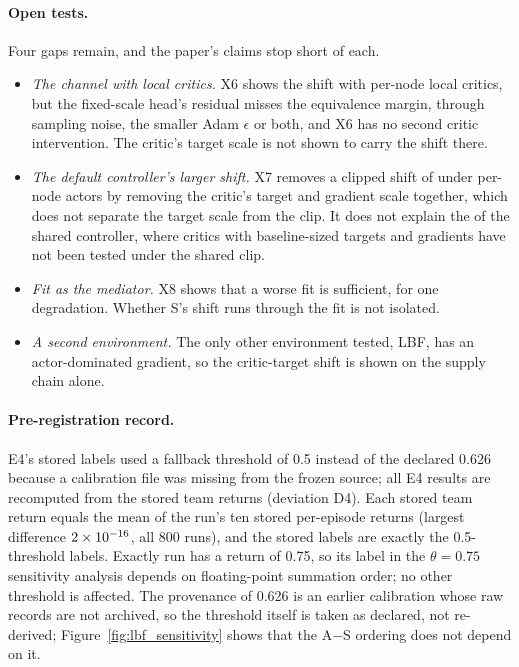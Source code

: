 \paragraph{Open tests.} Four gaps remain, and the paper's claims stop short of each.
\begin{itemize}
\item \emph{The channel with local critics.} X6 shows the shift with per-node local critics, but the fixed-scale head's
residual misses the equivalence margin, through sampling noise, the smaller Adam $\epsilon$ or both, and X6 has no second critic intervention. The critic's target scale is not shown to carry the shift there.
\item \emph{The default controller's larger shift.} X7 removes a clipped shift of \VxsevPlain{} under per-node actors by
removing the critic's target and gradient scale together, which does not separate the target scale from the clip. It does not explain the \VjtPStd{} of the shared controller, where critics with
baseline-sized targets and gradients have not been tested under the shared clip.
\item \emph{Fit as the mediator.} X8 shows that a worse fit is sufficient, for one degradation. Whether S's shift runs
through the fit is not isolated.
\item \emph{A second environment.} The only other environment tested, LBF, has an actor-dominated gradient, so the
critic-target shift is shown on the supply chain alone.
\end{itemize}

\paragraph{Pre-registration record.} E4's stored labels used a fallback threshold of 0.5 instead of the
declared 0.626 because a calibration file was missing from the frozen source; all E4 results are recomputed
from the stored team returns (deviation D4). Each stored team return equals the mean of the run's ten stored
per-episode returns (largest difference $2\times10^{-16}{}$, all 800 runs), and the stored labels are exactly the
0.5-threshold labels. Exactly \VdaETies{} run has a return of 0.75, so its label in the $\theta=0.75$ sensitivity
analysis depends on floating-point summation order; no other threshold is affected. The provenance of 0.626 is an earlier calibration whose raw
records are not archived, so the threshold itself is taken as declared, not re-derived; Figure~\ref{fig:lbf_sensitivity}
shows that the A$-$S ordering does not depend on it.

